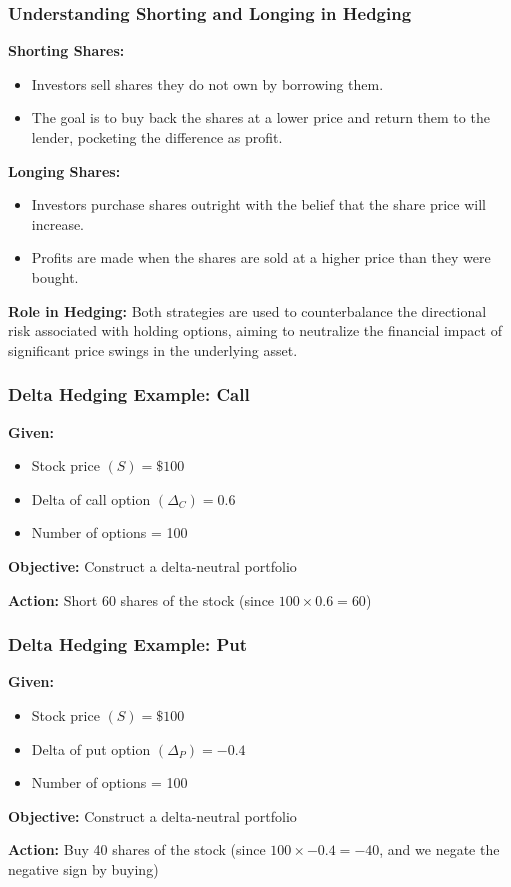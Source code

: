 \documentclass{beamer}
\begin{document}
\begin{frame}
\frametitle{Understanding Shorting and Longing in Hedging}

\textbf{Shorting Shares:}
\begin{itemize}
  \item Investors sell shares they do not own by borrowing them.
  \item The goal is to buy back the shares at a lower price and return them to the lender, pocketing the difference as profit.
\end{itemize}

\textbf{Longing Shares:}
\begin{itemize}
  \item Investors purchase shares outright with the belief that the share price will increase.
  \item Profits are made when the shares are sold at a higher price than they were bought.
\end{itemize}

\textbf{Role in Hedging:}
Both strategies are used to counterbalance the directional risk associated with holding options, aiming to neutralize the financial impact of significant price swings in the underlying asset.

\end{frame}


\begin{frame}
\frametitle{Delta Hedging Example: Call}

\textbf{Given:}
\begin{itemize}
  \item Stock price $(S) = \$100$
  \item Delta of call option $(\Delta_C) = 0.6$
  \item Number of options = 100
\end{itemize}

\textbf{Objective:} Construct a delta-neutral portfolio

\textbf{Action:} Short 60 shares of the stock (since $100 \times 0.6 = 60$)

\end{frame}

\begin{frame}
\frametitle{Delta Hedging Example: Put}

\textbf{Given:}
\begin{itemize}
  \item Stock price $(S) = \$100$
  \item Delta of put option $(\Delta_P) = -0.4$
  \item Number of options = 100
\end{itemize}

\textbf{Objective:} Construct a delta-neutral portfolio

\textbf{Action:} Buy 40 shares of the stock (since $100 \times -0.4 = -40$, and we negate the negative sign by buying)

\end{frame}
\end{document}
